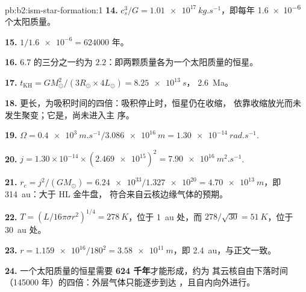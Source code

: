 \begin{solution}{pb:b2:ism-star-formation:1}
\textbf{14.} $c_s^3/G = \qty{1.01e17}{kg.s^{-1}}$，即每年 \num{1.6e-6} 个太阳质量。

\textbf{15.} $1/\num{1.6e-6} = \num{624000}$ 年。

\textbf{16.} 6.7 的三分之一约为 $2.2$：即两颗质量各为一个太阳质量的恒星。

\textbf{17.} $t_{\mathrm{KH}} = GM_\odot^2/(3R_\odot\times4L_\odot) = \qty{8.25e13}{s}$，
\qty{2.6}{Ma}。

\textbf{18.} 更长，为吸积时间的四倍：吸积停止时，恒星仍在收缩，
依靠收缩放光而未发生聚变；它是，尚未进入主
序。

\textbf{19.} $\Omega = \qty{0.4e3}{m.s^{-1}}/\qty{3.086e16}{m} = \qty{1.30e-14}{rad.s^{-1}}$.

\textbf{20.} $j = 1.30\times10^{-14}\times(\num{2.469e15})^2 = \qty{7.90e16}{m^2.s^{-1}}$.

\textbf{21.} $r_c = j^2/(GM_\odot) = \num{6.24e33}/\num{1.327e20} = \qty{4.70e13}{m}$，即
\qty{314}{au}：大于 HL 金牛盘，
符合来自云核边缘气体的预期。

\textbf{22.} $T = (L/16\pi\sigma r^2)^{1/4} = \qty{278}{K}$，位于 \qty{1}{au} 处，而
$278/\sqrt{30} = \qty{51}{K}$，位于 \qty{30}{au} 处。

\textbf{23.} $r = \num{1.159e16}/180^2 = \qty{3.58e11}{m}$，即 \qty{2.4}{au}，与正文一致。

\textbf{24.} 一个太阳质量的恒星需要
\textbf{\qty[text-series-to-math=true]{624}{} 千年}才能形成，约为
其云核自由下落时间（\num{145000} 年）的四倍：外层气体只能逐步到达
，且自内向外进行。
\end{solution}
